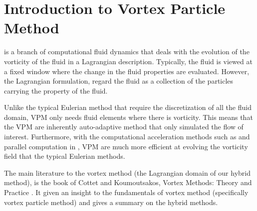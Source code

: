 


\section{Introduction to Vortex Particle Method}
 is a branch of computational fluid dynamics that deals with the evolution of the vorticity of the fluid in a Lagrangian description. Typically, the fluid is viewed at a fixed window where the change in the fluid properties are evaluated. However, the Lagrangian formulation, regard the fluid as a collection of the particles carrying the property of the fluid. 

Unlike the typical Eulerian method that require the discretization of all the fluid domain, VPM only needs fluid elements where there is vorticity. This means that the VPM are inherently auto-adaptive method that only simulated the flow of interest. Furthermore, with the computational acceleration methods such as  and parallel computation in , VPM are much more efficient at evolving the vorticity field that the typical Eulerian methods.

The main literature to the vortex method (the Lagrangian domain of our hybrid method), is the book of Cottet and Koumoutsakos, Vortex Methods: Theory and Practice \cite{Cottet2000a}. It given an insight to the fundamentals of vortex method (specifically vortex particle method) and gives a summary on the hybrid methods.

